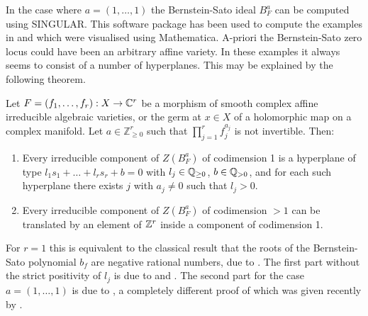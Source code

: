     In the case where $a =(1,\ldots,1)$ the Bernstein-Sato ideal $B_F^a$ can be computed using SINGULAR.
    This software package has been used to compute the examples in  and  which were visualised using Mathematica.
    A-priori the Bernstein-Sato zero locus could have been an arbitrary affine variety.
    In these examples it always seems to consist of a number of hyperplanes.
    This may be explained by the following theorem.
    \begin{theorem}{\cite[Theorem 1.1.1]{budur2020zeroII}} \label{thrmMoreA}   Let $F=(f_1,\ldots,f_r):X\rightarrow\mathbb{C}^r$ be a morphism of smooth complex affine irreducible algebraic varieties, or the germ at $x\in X$ of a holomorphic map on a complex manifold.  Let $a\in\mathbb{Z}_{\geq 0}^r$ such that $\prod_{j=1}^rf_j^{a_j}$ is not invertible. Then:
    \begin{enumerate}
    \item Every irreducible component of $Z(B_F^{a})$ of codimension 1 is a  hyperplane of type $l_1s_1+\ldots+l_rs_r+b=0$ with $l_j\in\mathbb{Q}_{\ge 0}$, $b\in\mathbb{Q}_{>0}$, and for each such hyperplane there exists $j$ with $a_j\ne 0$ such that $l_j>0$.
    \item Every irreducible component of  $Z(B_F^{a})$ of codimension $>1$  can be translated by an element of $\mathbb{Z}^r$ inside a component of codimension 1.
    \end{enumerate}
    \end{theorem}
    For $r=1$ this is equivalent to the classical result that the roots of the Bernstein-Sato polynomial $b_f$ are negative rational numbers, due to \cite{kashiwara1976b}.
    The first part without the strict positivity of $l_j$ is due to \cite{sabbah1987proximite} and  \cite{gyoja1993bernstein}.
    The second part for the case $a=(1,\ldots,1)$ is due to \cite{maisonobe2016filtration}, a completely different proof of which was given recently by \cite{robin}.
